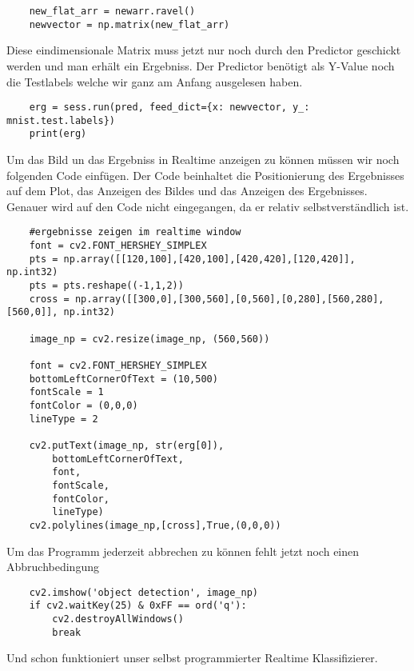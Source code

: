 \begin{lstlisting}
    new_flat_arr = newarr.ravel()
    newvector = np.matrix(new_flat_arr)
\end{lstlisting}
Diese eindimensionale Matrix muss jetzt nur noch durch den Predictor geschickt werden und man erhält ein Ergebniss. Der Predictor benötigt als Y-Value noch die Testlabels welche wir ganz am Anfang ausgelesen haben.
\begin{lstlisting}
    erg = sess.run(pred, feed_dict={x: newvector, y_: mnist.test.labels})
    print(erg)
\end{lstlisting}
Um das Bild un das Ergebniss in Realtime anzeigen zu können müssen wir noch folgenden Code einfügen. Der Code beinhaltet die Positionierung des Ergebnisses auf dem Plot, das Anzeigen des Bildes und das Anzeigen des Ergebnisses. Genauer wird auf den Code nicht eingegangen, da er relativ selbstverständlich ist.
\begin{lstlisting}
    #ergebnisse zeigen im realtime window
    font = cv2.FONT_HERSHEY_SIMPLEX
    pts = np.array([[120,100],[420,100],[420,420],[120,420]], np.int32)
    pts = pts.reshape((-1,1,2))
    cross = np.array([[300,0],[300,560],[0,560],[0,280],[560,280],[560,0]], np.int32)

    image_np = cv2.resize(image_np, (560,560))

    font = cv2.FONT_HERSHEY_SIMPLEX
    bottomLeftCornerOfText = (10,500)
    fontScale = 1
    fontColor = (0,0,0)
    lineType = 2

    cv2.putText(image_np, str(erg[0]),
        bottomLeftCornerOfText,
        font,
        fontScale,
        fontColor,
        lineType)
    cv2.polylines(image_np,[cross],True,(0,0,0))
\end{lstlisting}
Um das Programm jederzeit abbrechen zu können fehlt jetzt noch einen Abbruchbedingung
\begin{lstlisting}
    cv2.imshow('object detection', image_np)
    if cv2.waitKey(25) & 0xFF == ord('q'):
        cv2.destroyAllWindows()
        break
\end{lstlisting}
Und schon funktioniert unser selbst programmierter Realtime Klassifizierer.

\label{cha:Usage}